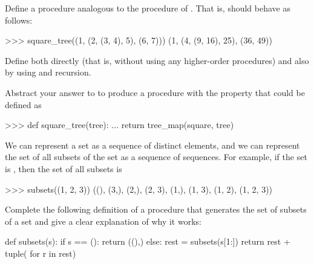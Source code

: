 \begin{exerciseGroup}
\label{Exercise 2.30}
 Define a procedure
 analogous to the  procedure of
.  That is,  should behave as follows:

\begin{codeBlock}
>>> square_tree((1, (2, (3, 4), 5), (6, 7)))
(1, (4, (9, 16), 25), (36, 49))
\end{codeBlock}

Define  both directly (that is, without using any
higher-order procedures) and also by using  and recursion.

\label{Exercise 2.31}
 Abstract your answer to
 to produce a procedure  with the property
that  could be defined as

\begin{codeBlock}
>>> def square_tree(tree):
...     return tree_map(square, tree)
\end{codeBlock}

\label{Exercise 2.32}
 We can represent a set as a
sequence of distinct elements, and we can represent the set of all subsets of
the set as a sequence of sequences.  For example, if the set is , then the set of all subsets is

\begin{codeBlock}
>>> subsets((1, 2, 3))
((), (3,), (2,), (2, 3), (1,), (1, 3), (1, 2), (1, 2, 3))
\end{codeBlock}

Complete the following definition of a procedure that generates the set of
subsets of a set and give a clear explanation of why it works:

\begin{syntaxForm}
def subsets(s):
    if s == ():
        return ((),)
    else:
        rest = subsets(s[1:])
        return rest + tuple( for r in rest)
\end{syntaxForm}
\end{exerciseGroup}

